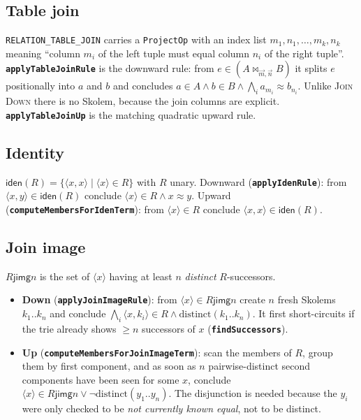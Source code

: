 \documentclass[11pt,a4paper]{article}
\newcommand{\code}[1]{\texttt{\small #1}}
\newcommand{\fn}[1]{\texttt{\small\bfseries #1}}
\newcommand{\tup}[1]{\langle #1 \rangle}
\theoremstyle{definition}
\begin{document}
\subsection{Table join}

\code{RELATION\_TABLE\_JOIN} carries a \code{ProjectOp} with an index list
$m_1,n_1,\dots,m_k,n_k$ meaning ``column $m_i$ of the left tuple must equal
column $n_i$ of the right tuple''. \fn{applyTableJoinRule} is the downward rule:
from $e \in (A \bowtie_{\vec m,\vec n} B)$ it splits $e$ positionally into $a$
and $b$ and concludes $a\in A \wedge b\in B \wedge \bigwedge_i a_{m_i} \approx
b_{n_i}$. Unlike \textsc{Join Down} there is no Skolem, because the join columns
are explicit. \fn{applyTableJoinUp} is the matching quadratic upward rule.

\subsection{Identity}

$\mathsf{iden}(R) = \{\tup{x,x}\mid \tup{x}\in R\}$ with $R$ unary.
Downward (\fn{applyIdenRule}): from $\tup{x,y}\in\mathsf{iden}(R)$ conclude
$\tup{x}\in R \wedge x\approx y$. Upward
(\fn{computeMembersForIdenTerm}): from $\tup{x}\in R$ conclude
$\tup{x,x}\in\mathsf{iden}(R)$.

\subsection{Join image}

$R \mathbin{\mathsf{jimg}} n$ is the set of $\tup{x}$ having at least $n$
\emph{distinct} $R$-successors.

\begin{itemize}[leftmargin=*,itemsep=1pt]
\item \textbf{Down} (\fn{applyJoinImageRule}): from $\tup{x}\in
  R\mathbin{\mathsf{jimg}} n$ create $n$ fresh Skolems $k_1..k_n$ and conclude
  $\bigwedge_i \tup{x,k_i}\in R \wedge \mathrm{distinct}(k_1..k_n)$. It first
  short-circuits if the trie already shows $\ge n$ successors of $x$
  (\fn{findSuccessors}).
\item \textbf{Up} (\fn{computeMembersForJoinImageTerm}): scan the members of
  $R$, group them by first component, and as soon as $n$ pairwise-distinct
  second components have been seen for some $x$, conclude
  $\tup{x}\in R\mathbin{\mathsf{jimg}} n \vee \neg\mathrm{distinct}(y_1..y_n)$.
  The disjunction is needed because the $y_i$ were only checked to be
  \emph{not currently known equal}, not to be distinct.
\end{itemize}
\end{document}
